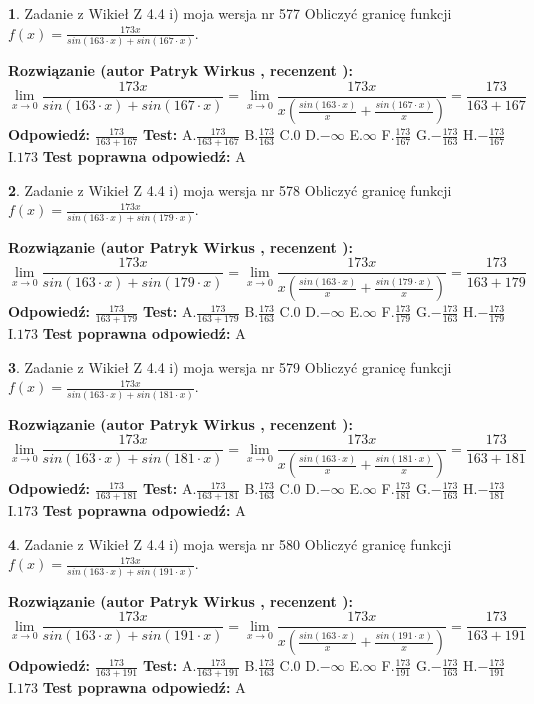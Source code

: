 \documentclass[12pt, a4paper]{article}
\theoremstyle{definition} %
\newtheorem{zad}{}
\newcommand{\zadStart}[1]{\begin{zad}#1\newline}
\newcommand{\zadStop}{\end{zad}}
\newcommand{\rozwStart}[2]{\noindent \textbf{Rozwiązanie (autor #1 , recenzent #2): }\newline}
\newcommand{\rozwStop}{\newline}
\newcommand{\odpStart}{\noindent \textbf{Odpowiedź:}\newline}
\newcommand{\odpStop}{\newline}
\newcommand{\testStart}{\noindent \textbf{Test:}\newline}
\newcommand{\testStop}{\newline}
\newcommand{\kluczStart}{\noindent \textbf{Test poprawna odpowiedź:}\newline}
\newcommand{\kluczStop}{\newline}
\begin{document}
\zadStart{Zadanie z Wikieł Z 4.4 i) moja wersja nr 577}
Obliczyć granicę funkcji $f(x)=\frac{173x}{sin(163\cdot x) +sin(167\cdot x)}$.
\zadStop
\rozwStart{Patryk Wirkus}{}
$$\lim\limits_{x\to 0}\frac{173x}{sin(163\cdot x) +sin(167\cdot x)}=\lim\limits_{x\to 0}\frac{173x}{x(\frac{sin(163\cdot x)}{x}+\frac{sin(167\cdot x)}{x})}=\frac{173}{163+167}$$
\rozwStop
\odpStart
$\frac{173}{163+167}$
\odpStop
\testStart
A.$\frac{173}{163+167}$
B.$\frac{173}{163}$
C.$0$
D.$-\infty$
E.$\infty$
F.$\frac{173}{167}$
G.$-\frac{173}{163}$
H.$-\frac{173}{167}$
I.$173$
\testStop
\kluczStart
A
\kluczStop



\zadStart{Zadanie z Wikieł Z 4.4 i) moja wersja nr 578}
Obliczyć granicę funkcji $f(x)=\frac{173x}{sin(163\cdot x) +sin(179\cdot x)}$.
\zadStop
\rozwStart{Patryk Wirkus}{}
$$\lim\limits_{x\to 0}\frac{173x}{sin(163\cdot x) +sin(179\cdot x)}=\lim\limits_{x\to 0}\frac{173x}{x(\frac{sin(163\cdot x)}{x}+\frac{sin(179\cdot x)}{x})}=\frac{173}{163+179}$$
\rozwStop
\odpStart
$\frac{173}{163+179}$
\odpStop
\testStart
A.$\frac{173}{163+179}$
B.$\frac{173}{163}$
C.$0$
D.$-\infty$
E.$\infty$
F.$\frac{173}{179}$
G.$-\frac{173}{163}$
H.$-\frac{173}{179}$
I.$173$
\testStop
\kluczStart
A
\kluczStop



\zadStart{Zadanie z Wikieł Z 4.4 i) moja wersja nr 579}
Obliczyć granicę funkcji $f(x)=\frac{173x}{sin(163\cdot x) +sin(181\cdot x)}$.
\zadStop
\rozwStart{Patryk Wirkus}{}
$$\lim\limits_{x\to 0}\frac{173x}{sin(163\cdot x) +sin(181\cdot x)}=\lim\limits_{x\to 0}\frac{173x}{x(\frac{sin(163\cdot x)}{x}+\frac{sin(181\cdot x)}{x})}=\frac{173}{163+181}$$
\rozwStop
\odpStart
$\frac{173}{163+181}$
\odpStop
\testStart
A.$\frac{173}{163+181}$
B.$\frac{173}{163}$
C.$0$
D.$-\infty$
E.$\infty$
F.$\frac{173}{181}$
G.$-\frac{173}{163}$
H.$-\frac{173}{181}$
I.$173$
\testStop
\kluczStart
A
\kluczStop



\zadStart{Zadanie z Wikieł Z 4.4 i) moja wersja nr 580}
Obliczyć granicę funkcji $f(x)=\frac{173x}{sin(163\cdot x) +sin(191\cdot x)}$.
\zadStop
\rozwStart{Patryk Wirkus}{}
$$\lim\limits_{x\to 0}\frac{173x}{sin(163\cdot x) +sin(191\cdot x)}=\lim\limits_{x\to 0}\frac{173x}{x(\frac{sin(163\cdot x)}{x}+\frac{sin(191\cdot x)}{x})}=\frac{173}{163+191}$$
\rozwStop
\odpStart
$\frac{173}{163+191}$
\odpStop
\testStart
A.$\frac{173}{163+191}$
B.$\frac{173}{163}$
C.$0$
D.$-\infty$
E.$\infty$
F.$\frac{173}{191}$
G.$-\frac{173}{163}$
H.$-\frac{173}{191}$
I.$173$
\testStop
\kluczStart
A
\kluczStop
\end{document}
